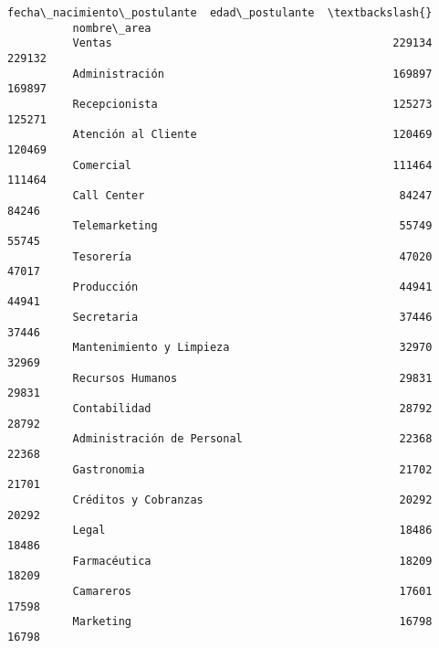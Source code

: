 \documentclass[11pt]{article}
\begin{document}
\begin{Verbatim}[commandchars=\\\{\}]
                                      fecha\_nacimiento\_postulante  edad\_postulante  \textbackslash{}
          nombre\_area                                                                
          Ventas                                           229134           229132   
          Administración                                   169897           169897   
          Recepcionista                                    125273           125271   
          Atención al Cliente                              120469           120469   
          Comercial                                        111464           111464   
          Call Center                                       84247            84246   
          Telemarketing                                     55749            55745   
          Tesorería                                         47020            47017   
          Producción                                        44941            44941   
          Secretaria                                        37446            37446   
          Mantenimiento y Limpieza                          32970            32969   
          Recursos Humanos                                  29831            29831   
          Contabilidad                                      28792            28792   
          Administración de Personal                        22368            22368   
          Gastronomia                                       21702            21701   
          Créditos y Cobranzas                              20292            20292   
          Legal                                             18486            18486   
          Farmacéutica                                      18209            18209   
          Camareros                                         17601            17598   
          Marketing                                         16798            16798   
          

\end{Verbatim}
\end{document}

